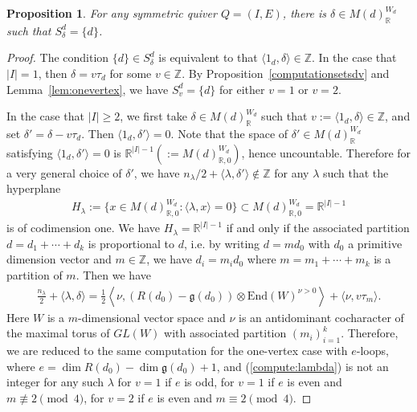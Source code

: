 \documentclass [11pt,oneside,a4paper,mathscr]{amsart}
\newtheorem{prop}[thm]{Proposition}
\theoremstyle{definition}
\renewcommand{\geq}{\geqslant}
\begin{document}
\begin{prop}\label{prop:delta}
For any symmetric quiver $Q=(I, E)$, there is $\delta \in M(d)_{\mathbb{R}}^{W_d}$ such that 
$S_{\delta}^d=\{d\}$. 
\end{prop}
\begin{proof}
    The condition $\{d\} \in S_{\delta}^d$ is equivalent to that 
    $\langle 1_d, \delta \rangle \in \mathbb{Z}$. 
    In the case that $\lvert I \rvert=1$, then $\delta=v\tau_d$ for some $v \in \mathbb{Z}$. 
    By Proposition~\ref{computationsetsdv} and Lemma~\ref{lem:onevertex}, we have 
    $S_{v}^d=\{d\}$ for either $v=1$ or $v=2$. 
    
    In the case that $\lvert I \rvert \geq 2$, 
    we first take $\delta \in M(d)_{\mathbb{R}}^{W_d}$
    such that $v:=\langle 1_d, \delta \rangle \in \mathbb{Z}$, and set $\delta'=\delta-v\tau_d$. 
    Then $\langle 1_d, \delta' \rangle =0$. 
Note that the space of 
    $\delta' \in M(d)_{\mathbb{R}}^{W_d}$ satisfying $\langle 1_d, \delta' \rangle=0$
    is $\mathbb{R}^{\lvert I \rvert-1}(:=M(d)_{\mathbb{R}, 0}^{W_d})$, hence uncountable. 
Therefore for a very general choice of $\delta'$, 
we have $n_{\lambda}/2+\langle \lambda, \delta' \rangle \notin \mathbb{Z}$
for any $\lambda$ such that the hyperplane 
\begin{align*}H_{\lambda}:=\{x\in M(d)_{\mathbb{R}, 0}^{W_d}: \langle \lambda, x \rangle=0\} 
\subset M(d)_{\mathbb{R}, 0}^{W_d}=\mathbb{R}^{\lvert I \rvert-1}
\end{align*}
is of codimension one. We have 
$H_{\lambda}=\mathbb{R}^{\lvert I \rvert-1}$ if and only 
if the associated partition 
$d=d_1+\cdots+d_k$ is proportional to $d$, i.e. 
by writing $d=m d_0$ with $d_0$ a primitive dimension 
vector and $m \in \mathbb{Z}$, we have $d_i=m_i d_0$
where $m=m_1+\cdots+m_k$ is a partition of $m$. 
Then we have 
\begin{align}\label{compute:lambda}
    \frac{n_{\lambda}}{2}+\langle \lambda, \delta \rangle 
    =\frac{1}{2}\left\langle \nu, (R(d_0)-\mathfrak{g}(d_0))
    \otimes \mathrm{End}(W)^{\nu >0} \right\rangle +\langle \nu, v\tau_m
    \rangle. 
\end{align}
Here $W$ is a $m$-dimensional vector space 
and $\nu$ is an antidominant cocharacter of the maximal 
torus of $GL(W)$ with associated partition $(m_i)_{i=1}^k$. 
Therefore, we are reduced to the same computation
for the one-vertex case
with $e$-loops, where 
$e=\dim R(d_0)-\dim \mathfrak{g}(d_0)+1$,
and 
(\ref{compute:lambda}) is not an integer
for any such $\lambda$ for $v=1$ if $e$ is odd, for $v=1$ if $e$ is even and  
$m \not\equiv 2 \pmod 4$, for $v=2$ if 
$e$ is even and $m\equiv 2 \pmod 4$. 
\end{proof}
\end{document}
